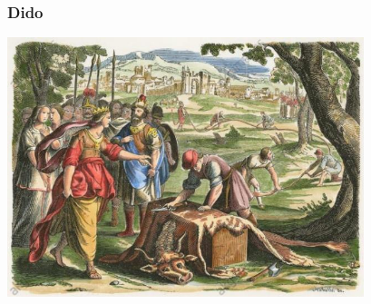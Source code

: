 %
%
%
\bgroup
\begin{frame}[t]
\setlength{\abovedisplayskip}{5pt}
\setlength{\belowdisplayskip}{5pt}
\frametitle{Dido}
\begin{center}
\includegraphics[width=10.4cm]{../../buch/chapters/050-nebenbedingungen/images/dido.jpg}
\end{center}
\end{frame}
\egroup
